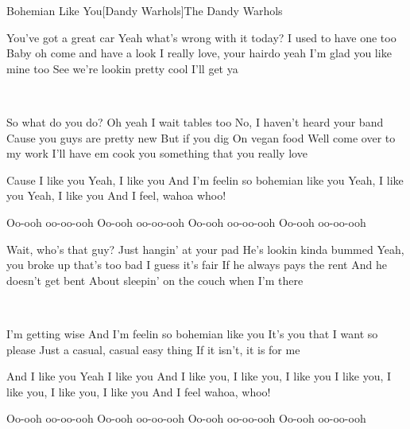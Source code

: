 \documentclass[a4paper,11pt,french]{article}
\begin{document}
\begin{Song}{Bohemian Like You}[Dandy Warhols]{The Dandy Warhols}
\begin{multicols}{2}

\begin{Verse}
You've got a great car
Yeah what's wrong with it today?
I used to have one too
Baby oh come and have a look
I really love, your hairdo yeah
I'm glad you like mine too
See we're lookin pretty cool
I'll get ya
\end{Verse}
\espaceInterStrophe

\\
\espaceInterStrophe

\begin{Verse}
So what do you do?
Oh yeah I wait tables too
No, I haven't heard your band
Cause you guys are pretty new
But if you dig
On vegan food
Well come over to my work
I'll have em cook you something that you really love
\end{Verse}
\espaceInterStrophe

\begin{Chorus}
Cause I like you
Yeah, I like you
And I'm feelin so bohemian like you
Yeah, I like you
Yeah, I like you
And I feel, wahoa whoo!
\espaceInterStrophe

Oo-ooh oo-oo-ooh
Oo-ooh oo-oo-ooh
Oo-ooh oo-oo-ooh
Oo-ooh oo-oo-ooh
\end{Chorus}
\columnbreak

\begin{Verse}
Wait, who's that guy?
Just hangin' at your pad
He's lookin kinda bummed
Yeah, you broke up that's too bad
I guess it's fair
If he always pays the rent
And he doesn't get bent
About sleepin' on the couch when I'm there
\end{Verse}
\espaceInterStrophe

\tochorus\\
\espaceInterStrophe

\begin{Verse}
I'm getting wise 
And I'm feelin so bohemian like you
It's you that I want so please
Just a casual, casual easy thing
If it isn't, it is for me
\end{Verse}
\espaceInterStrophe

\begin{Chorus}
And I like you
Yeah I like you
And I like you, I like you, I like you
I like you, I like you, I like you, I like you
And I feel wahoa, whoo!
\espaceInterStrophe

Oo-ooh oo-oo-ooh
Oo-ooh oo-oo-ooh
Oo-ooh oo-oo-ooh
Oo-ooh oo-oo-ooh
\end{Chorus}
\vfill
~
\end{multicols}


\end{Song}
\end{document}
